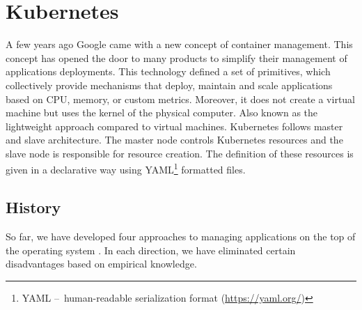 \section{Kubernetes}
\label{01:sec:title}

A few years ago Google came with a new concept of container management. This concept has opened the door to many products to simplify their management of applications deployments. This technology defined a set of primitives, which collectively provide mechanisms that deploy, maintain and scale applications based on CPU, memory, or custom metrics. Moreover, it does not create a virtual machine but uses the kernel of the physical computer. Also known as the lightweight approach compared to virtual machines. Kubernetes follows master and slave architecture. The master node controls Kubernetes resources and the slave node is responsible for resource creation. The definition of these resources is given in a declarative way using YAML\footnote{YAML 
\---\ human-readable serialization format (\url{https://yaml.org/})} formatted files.

\subsection{History}
\label{fig:history}

So far, we have developed four approaches to managing applications on the top of the operating system \cite{history}. In each direction, we have eliminated certain disadvantages based on empirical knowledge. 

